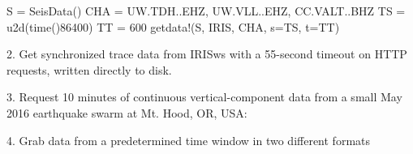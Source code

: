 \documentclass[letterpaper,11pt,english]{sphinxmanual}
\begin{document}
\begin{sphinxVerbatim}[commandchars=\\\{\}]
S = SeisData()
CHA = \PYGZdq{}UW.TDH..EHZ, UW.VLL..EHZ, CC.VALT..BHZ\PYGZdq{}
TS = u2d(time()\PYGZhy{}86400)
TT = 600
get\PYGZus{}data!(S, \PYGZdq{}IRIS\PYGZdq{}, CHA, s=TS, t=TT)
\end{sphinxVerbatim}

2. Get synchronized trace data from IRISws with a 55-second timeout on HTTP requests, written directly to disk.

\begin{sphinxVerbatim}[commandchars=\\\{\}]
  
  
  
        
\end{sphinxVerbatim}

3. Request 10 minutes of continuous vertical-component data from a small May 2016 earthquake swarm at Mt. Hood, OR, USA:

\begin{sphinxVerbatim}[commandchars=\\\{\}]
  
     
      
\end{sphinxVerbatim}

4. Grab data from a predetermined time window in two different formats
\end{document}
